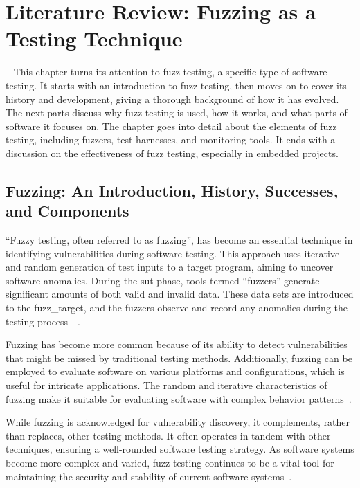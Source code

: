 \vspace{21.5pt}
\chapter{Literature Review: Fuzzing as a Testing Technique}~\label{sec:sec_fuzzing}
This chapter turns its attention to fuzz testing, a specific type of software
testing. It starts with an introduction to fuzz testing, then moves on to cover
its history and development, giving a thorough background of how it has evolved.
The next parts discuss why fuzz testing is used, how it works, and what parts of
software it focuses on. The chapter goes into detail about the elements of fuzz
testing, including \gls{fuzzers}, test harnesses, and monitoring tools. It ends with a
discussion on the effectiveness of fuzz testing, especially in embedded projects.

\section{Fuzzing: An Introduction, History, Successes, and Components}
``Fuzzy testing, often referred to as fuzzing'', has become an essential technique in
identifying vulnerabilities during software testing. This approach uses iterative and
random generation of test inputs to a target program, aiming to uncover software anomalies.
During the \gls{sut} phase, tools termed ``fuzzers'' generate significant amounts
of both valid and invalid data. These data sets are introduced to the \gls{fuzz_target}, and the
\gls{fuzzers} observe and record any anomalies during the testing process~\cite{klees2018evaluating}~\cite{li2018fuzzing}.

Fuzzing has become more common because of its ability to detect vulnerabilities\cite{thiel2008exposing}
that might be missed by traditional testing methods. Additionally, fuzzing can be employed
to evaluate software on various platforms and configurations, which is useful
for intricate applications. The random and iterative characteristics of fuzzing make it suitable for
evaluating software with complex behavior patterns~\cite{klees2018evaluating}.

While fuzzing is acknowledged for vulnerability discovery,
it complements, rather than replaces, other testing methods.
It often operates in tandem with other techniques, ensuring
a well-rounded software testing strategy. As software systems become more complex
and varied, fuzz testing continues to be a vital tool for maintaining the
security and stability of current software systems~\cite{kim2011efficient}.

